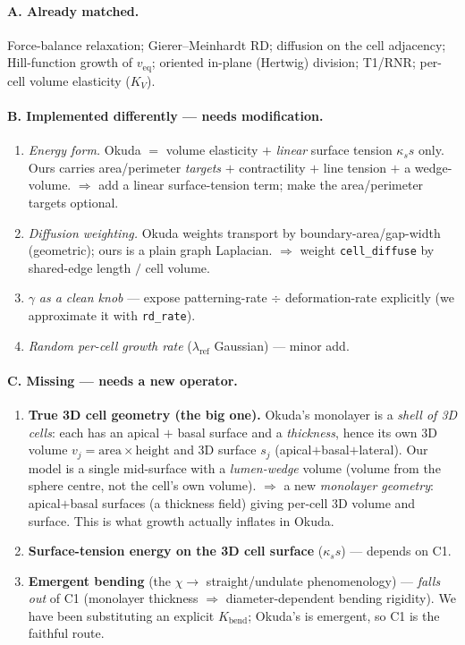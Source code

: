 \documentclass[11pt]{article}
\begin{document}
\paragraph{A. Already matched.} Force-balance relaxation; Gierer--Meinhardt RD; diffusion on the cell
adjacency; Hill-function growth of $v_{\text{eq}}$; oriented in-plane (Hertwig) division; T1/RNR; per-cell
volume elasticity ($K_V$).

\paragraph{B. Implemented differently --- needs modification.}
\begin{enumerate}\itemsep2pt
\item \emph{Energy form.} Okuda $=$ volume elasticity $+$ \emph{linear} surface tension $\kappa_s s$ only. Ours
carries area/perimeter \emph{targets} $+$ contractility $+$ line tension $+$ a wedge-volume. $\Rightarrow$ add
a linear surface-tension term; make the area/perimeter targets optional.
\item \emph{Diffusion weighting.} Okuda weights transport by boundary-area/gap-width (geometric); ours is a
plain graph Laplacian. $\Rightarrow$ weight \texttt{cell\_diffuse} by shared-edge length $/$ cell volume.
\item $\gamma$ \emph{as a clean knob} --- expose patterning-rate $\div$ deformation-rate explicitly (we
approximate it with \texttt{rd\_rate}).
\item \emph{Random per-cell growth rate} ($\lambda_{\text{ref}}$ Gaussian) --- minor add.
\end{enumerate}

\paragraph{C. Missing --- needs a new operator.}
\begin{enumerate}\itemsep2pt
\item \textbf{True 3D cell geometry (the big one).} Okuda's monolayer is a \emph{shell of 3D cells}: each has
an apical $+$ basal surface and a \emph{thickness}, hence its own 3D volume $v_j=\text{area}\times\text{height}$
and 3D surface $s_j$ (apical$+$basal$+$lateral). Our model is a single mid-surface with a \emph{lumen-wedge}
volume (volume from the sphere centre, not the cell's own volume). $\Rightarrow$ a new \emph{monolayer
geometry}: apical$+$basal surfaces (a thickness field) giving per-cell 3D volume and surface. This is what
growth actually inflates in Okuda.
\item \textbf{Surface-tension energy on the 3D cell surface} ($\kappa_s s$) --- depends on C1.
\item \textbf{Emergent bending} (the $\chi\to$ straight/undulate phenomenology) --- \emph{falls out} of C1
(monolayer thickness $\Rightarrow$ diameter-dependent bending rigidity). We have been substituting an
explicit $K_{\text{bend}}$; Okuda's is emergent, so C1 is the faithful route.
\end{enumerate}
\end{document}
